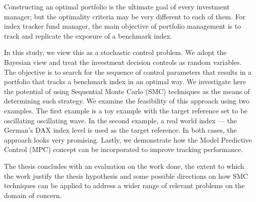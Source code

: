 


\begin{abstracts}        %
  Constructing an optimal portfolio is the ultimate goal of every investment manager; but the optimality criteria may be very different to each of them. For index tracker fund manager, the main objective of portfolio management is to track and replicate the exposure of a benchmark index.

In this study, we view this as a stochastic control problem. We adopt the Bayesian view and treat the investment decision controls as random variables. The objective is to search for the sequence of control parameters that results in a portfolio that tracks a benchmark index in an optimal way. We investigate here the potential of using Sequential Monte Carlo (SMC) techniques as the means of determining such strategy. We examine the feasibility of this approach using two examples. The first example is a toy example with the target reference set to be oscillating oscillating wave. In the second example, a real world index --- the German's DAX index level is used as the target reference. In both cases, the approach looks very promising. Lastly, we demonstrate how the Model Predictive Control (MPC) concept can be incorporated to improve tracking performance.

  The thesis concludes with an evaluation on the work done, the extent
  to which the work justify the thesis hypothesis and some possible
  directions on how SMC techniques can be applied to address
  a wider range of relevant problems on the domain of concern.
\end{abstracts}




